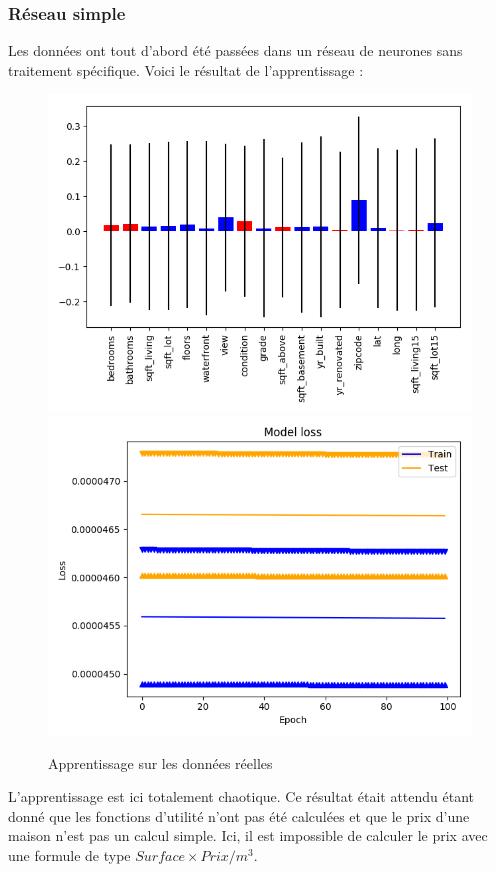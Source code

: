 \subsubsection{Réseau simple}\label{subsubsec:real-simple}
Les données ont tout d'abord été passées dans un réseau de neurones sans traitement spécifique.
Voici le résultat de l'apprentissage :
\begin{figure}[H]
    \center
    \includegraphics[width=0.49\columnwidth]{pict/real/raw/res.png}
    \includegraphics[width=0.49\columnwidth]{pict/real/raw/learn.png}
	\caption{Apprentissage sur les données réelles}
	\label{fig:def_100_100}
\end{figure}
L'apprentissage est ici totalement chaotique.
Ce résultat était attendu étant donné que les fonctions d'utilité n'ont pas été
calculées et que le prix d'une maison n'est pas un calcul simple.
Ici, il est impossible de calculer le prix avec une formule de type $Surface \times Prix/m^3$.\\



